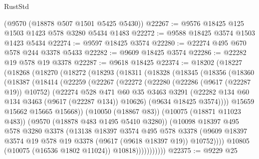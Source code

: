 \begin{lexlean}{RustStd}
\begin{coremodule}
{\begin{coremodule}
{{{{{{{{{{{{{{{{{{{{{{{{{{{{{{{{{    (@9570 (@18878 @507 @1501 @5425 @5430))
@22267 := @9576 @18425 @125 @1503 @1423 @578 @3280 @5434 @1483
@22272 := @9588 @18425 @3574 @1503 @1423 @5434
@22274 := @9597 @18425 @3574
@22280 := @22274 @495 @670 @578 @244 @3378 @5433
@22282 := @9609 @18425 @3574
@22286 := @22282 @19 @578 @19 @3378
@22287 := @9618 @18425
@22374 := @18202
    (@18227
      (@18268
        (@18270
          (@18272
            (@18293
              (@18311
                (@18328
                  (@18345
                    (@18356
                      (@18360
                        (@18387
                          (@18414
                            (@22259
                              (@22267
                                (@22272
                                  (@22280
                                    (@22286 (@9617 (@22287 @19)) @10752)
                                    (@22274
                                      @528
                                      @471
                                      @60
                                      @35
                                      @3463
                                      @3291
                                      (@22282 @134 @60 @134 @3463 (@9617 (@22287 @134)) @10626)
                                      (@9634 @18425 @3574))))
                                @15659
                                @15662
                                @15665
                                @15668))
                            (@10050 (@18867 @83))
                            (@10075 (@18871 @11023 @483))
                            (@9570 (@18878 @483 @1495 @5410 @3280))
                            (@10098
                              @18397
                              @495
                              @578
                              @3280
                              @3378
                              (@13138
                                @18397
                                @3574
                                @495
                                @578
                                @3378
                                (@9609
                                  @18397
                                  @3574
                                  @19
                                  @578
                                  @19
                                  @3378
                                  (@9617 (@9618 @18397 @19))
                                  @10752))))
                          @10805
                          (@10075 (@16536 @1802 @11024))
                          @10818)))))))))))
@22375 := @9229 @25
}}}}}}}}}}}}}}}}}}}}}}}}}}}}}}}}}
\end{coremodule}}
\end{coremodule}
\end{lexlean}
